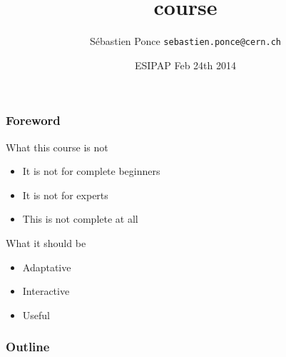 \documentclass[compress]{beamer}
\title{\cpp course}
\author[S. Ponce]{S\'ebastien Ponce  \texttt{sebastien.ponce@cern.ch}}
\institute{CERN}
\date{ESIPAP Feb 24th 2014}
\begin{document}
\begin{frame}
  \titlepage
\end{frame}

\begin{frame}
  \frametitle{Foreword}
  \begin{block}{What this course is not}
    \begin{itemize}
    \item It is not for complete beginners
    \item It is not for experts
    \item This is not complete at all
    \end{itemize}
  \end{block}
  \begin{block}{What it should be}
    \begin{itemize}
    \item Adaptative
    \item Interactive
    \item Useful
    \end{itemize}
  \end{block}
\end{frame}

\begin{frame}
  \frametitle{Outline}
  \tableofcontents[sectionstyle=show,subsectionstyle=hide]
\end{frame}



%

%
\end{document}
